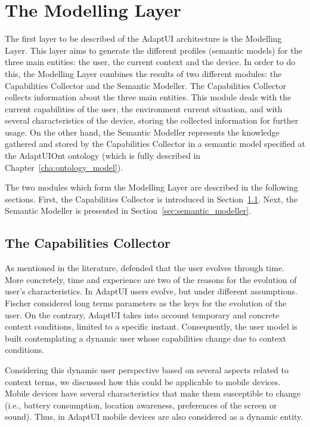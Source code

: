 \section{The Modelling Layer}
\label{sec:modelling_layer}

The first layer to be described of the AdaptUI architecture is the Modelling
Layer. This layer aims to generate the different profiles (semantic models) for
the three main entities: the user, the current context and the device. In order
to do this, the Modelling Layer combines the results of two different modules: 
the Capabilities Collector and the Semantic Modeller. The Capabilities Collector
collects information about the three main entities. This module deals with the
current capabilities of the user, the environment current situation, and with
several characteristics of the device, storing the collected information for
further usage. On the other hand, the Semantic Modeller represents the knowledge
gathered and stored by the Capabilities Collector in a semantic model specified
at the AdaptUIOnt ontology (which is fully described in 
Chapter~\ref{cha:ontology_model}). 

The two modules which form the Modelling Layer are described in the following
sections. First, the Capabilities Collector is introduced in
Section~\ref{sec:capabilities_collector}. Next, the Semantic Modeller is
presented in Section~\ref{sec:semantic_modeller}.


\subsection{The Capabilities Collector}
\label{sec:capabilities_collector}

As mentioned in the literature, \citet{fischer_user_2001} defended that the user
evolves through time. More concretely, time and experience are two of the 
reasons for the  evolution of user's characteristics. In AdaptUI users 
evolve, but under different assumptions. Fischer considered long terms 
parameters as the keys for the evolution of the user. On the contrary, AdaptUI 
takes into account temporary and concrete context conditions, limited to a 
specific instant. Consequently, the user model is built contemplating a dynamic 
user whose capabilities change due to context conditions.

Considering this dynamic user perspective based on several aspects related to
context terms, we discussed how this could be applicable to mobile devices. 
Mobile devices have several characteristics that make them susceptible to change 
(i.e., battery consumption, location awareness, preferences of the screen or 
sound). Thus, in AdaptUI mobile devices are also considered as a dynamic entity.

